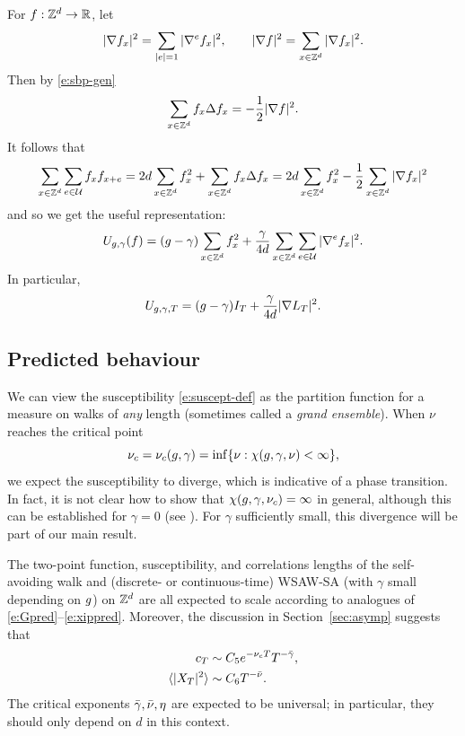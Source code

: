 For $f : { {{\mathbb Z}}^d } \rightarrow {\mathbb R}$, let 
\begin{equation}
|\nabla f_x|^2 = \sum_{|e|=1} |\nabla^e f_x|^2,
	\qquad
|\nabla f|^2 = \sum_{x\in{ {{\mathbb Z}}^d }} |\nabla f_x|^2.
\end{equation}
Then by \eqref{e:sbp-gen}
\begin{equation}
\label{e:sbp}
\sum_{x\in{ {{\mathbb Z}}^d }} f_x \Delta f_x
	=
-\frac{1}{2} |\nabla f|^2.
\end{equation}
It follows that
\begin{equation}
\sum_{x\in{ {{\mathbb Z}}^d }} \sum_{e\in\mathcal{U}} f_x f_{x+e}
=
2 d \sum_{x\in{ {{\mathbb Z}}^d }} f_x^2
+ \sum_{x\in{ {{\mathbb Z}}^d }} f_x \Delta f_x
=
2 d \sum_{x\in{ {{\mathbb Z}}^d }} f_x^2
- \frac{1}{2} \sum_{x\in{ {{\mathbb Z}}^d }} |\nabla f_x|^2
\end{equation}
and so we get the useful representation:
\begin{equation}
\label{e:Udef-pos}
U_{g,\gamma}(f)
= (g - \gamma) \sum_{x\in{ {{\mathbb Z}}^d }} f_x^2
+ \frac{\gamma}{4d} \sum_{x\in{ {{\mathbb Z}}^d }} \sum_{e\in\mathcal{U}} |\nabla^e f_x|^2.
\end{equation}
In particular,
\begin{equation}
  \label{e:V2}
  U_{g,\gamma,T} =
  (g - \gamma) I_T
  + \frac{\gamma}{4d}
  |\nabla L_T|^2
  .
\end{equation}


\subsection{Predicted behaviour}

We can view the susceptibility \eqref{e:suscept-def} as the partition function
for a measure on walks of \emph{any} length (sometimes called a \emph{grand
ensemble}). When $\nu$ reaches the critical point
\begin{equation}
\nu_c = \nu_c(g, \gamma) = \inf\{ \nu : \chi(g,\gamma,\nu) < \infty \},
\end{equation}
we expect the susceptibility to diverge, which is indicative of a phase transition.
In fact, it is not clear how to show that $\chi(g,\gamma,\nu_c) = \infty$ in
general, although this can be established for $\gamma = 0$
(see \cite[Lemma~\ref{log-lem:csub}]{BBS-saw4-log}). For $\gamma$
sufficiently small, this divergence will be part of our main result.

The two-point function, susceptibility, and correlations lengths of the
self-avoiding walk and (discrete- or continuous-time) WSAW-SA (with $\gamma$ small
depending on $g$) on ${ {{\mathbb Z}}^d }$ are all expected
to scale according to analogues of \eqref{e:Gpred}--\eqref{e:xippred}.
Moreover, the discussion in Section~\ref{sec:asymp} suggests that
\begin{align}
\label{e:cT-asymp}
c_T                       &\sim C_5 e^{-\nu_c T} T^{-\bar\gamma}, \\
\label{e:XT-asymp}
\langle |X_T|^2 \rangle   &\sim C_6 T^{-\bar\nu}.
\end{align}
The critical exponents $\bar\gamma, \bar\nu, \eta$ are expected to be universal;
in particular, they should only depend on $d$ in this context.

